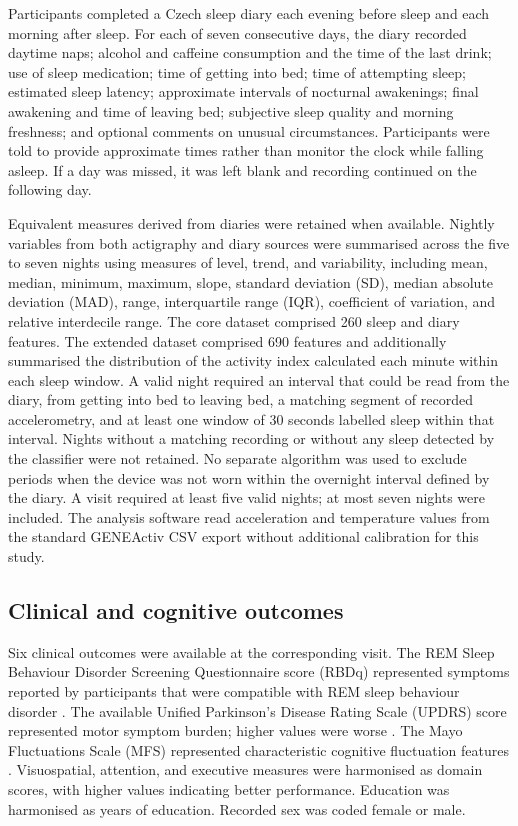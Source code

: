 \documentclass[referee,pdflatex,sn-vancouver-num]{sn-jnl}
\begin{document}
Participants completed a Czech sleep diary each evening
before sleep and each morning after sleep. For each of seven consecutive days,
the diary recorded daytime naps; alcohol and caffeine consumption and the time
of the last drink; use of sleep medication; time of getting into bed; time of
attempting sleep; estimated sleep latency; approximate intervals of nocturnal
awakenings; final awakening and time of leaving bed; subjective sleep quality and
morning freshness; and optional comments on unusual circumstances. Participants
were told to provide approximate times rather than monitor the clock while
falling asleep. If a day was missed, it was left blank and recording continued
on the following day.

Equivalent measures derived from diaries were retained when available. Nightly
variables from both actigraphy and diary sources were summarised across the five to seven nights using measures of
level, trend, and variability, including mean, median, minimum, maximum, slope,
standard deviation (SD), median absolute deviation (MAD), range, interquartile
range (IQR), coefficient of variation, and relative interdecile range. The core
dataset comprised 260 sleep and diary features. The extended dataset comprised
690 features and additionally summarised the distribution of the activity
index calculated each minute within each sleep window. A valid night required
an interval that could be read from the diary, from getting into bed to leaving bed,
a matching segment of recorded accelerometry, and at least one window of 30 seconds labelled sleep
within that interval. Nights without a matching recording or without any
sleep detected by the classifier were not retained. No separate algorithm was
used to exclude periods when the device was not worn within the overnight interval defined by the diary. A visit
required at least five valid nights; at most seven nights were included. The
analysis software read acceleration and temperature values from the standard
GENEActiv CSV export without additional calibration for this study.

\subsection{Clinical and cognitive outcomes}\label{subsec:outcomes}

Six clinical outcomes were available at the corresponding visit. The REM Sleep
Behaviour Disorder Screening Questionnaire score (RBDq) represented
symptoms reported by participants that were compatible with REM sleep behaviour disorder
\cite{stiasnykolster2007rbdsq}. The available Unified Parkinson's Disease
Rating Scale (UPDRS) score represented motor symptom burden; higher values were
worse \cite{fahn1987updrs}. The Mayo Fluctuations Scale (MFS) represented
characteristic cognitive fluctuation features \cite{ferman2004fluctuations}. Visuospatial, attention,
and executive measures were harmonised as domain scores, with higher values
indicating better performance. Education was harmonised as years of education. 
Recorded sex was coded female or male.
\end{document}
